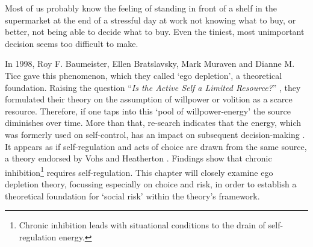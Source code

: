 Most of us probably know the feeling of standing in front of a shelf in the supermarket at the end of a stressful day at work not knowing what to buy, or better, not being able to decide what to buy. Even the tiniest, most unimportant decision seems too difficult to make.\par
In 1998, Roy F. Baumeister, Ellen Bratslavsky, Mark Muraven and Dianne M. Tice gave this phenomenon, which they called ‘ego depletion’, a theoretical foundation. Raising the question “\emph{Is the Active Self a Limited Resource?}” \citep{baumeister1998ego}, they formulated their theory on the assumption of willpower or volition as a scarce resource. Therefore, if one taps into this ‘pool of willpower-energy’ the source diminishes over time. More than that, re-search indicates that the energy, which was formerly used on self-control, has an impact on subsequent decision-making \citep{muraven1998self}. It appears as if self-regulation and acts of choice are drawn from the same source, a theory endorsed by Vohs and Heatherton \citep{vohs2000self}. Findings show that chronic inhibition\footnote{Chronic inhibition leads with situational conditions to the drain of self-regulation energy.\citep{vohs2000self} } requires self-regulation. This chapter will closely examine ego depletion theory, focussing especially on choice and risk, in order to establish a theoretical foundation for ‘social risk’ within the theory’s framework.
